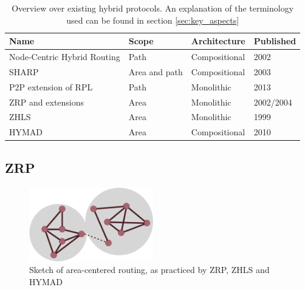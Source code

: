 \documentclass[a4paper,10pt]{scrartcl}
\begin{document}
\begin{table}[t]
    \begin{tabular}{p{}|l|l|l}
        Name & Scope & Architecture & Published \\
        \hline
        Node-Centric Hybrid Routing \cite{Roy_nodecentric} & Path & Compositional & 2002 \\ %
        SHARP\cite{SHARP} & Area and path & Compositional & 2003 \\ %
        P2P extension\cite{RFC-6997} of RPL\cite{RFC-6550} & Path & Monolithic & 2013\\
        ZRP \cite{ZRP-Draft} and extensions \cite{TZRP} \cite{IZR} \cite{WARP} & Area & Monolithic & 2002/2004\\
        ZHLS\cite{ZHLS} & Area & Monolithic & 1999\\
        HYMAD\cite{HYMAD} & Area & Compositional & 2010\\ %
    \end{tabular}
    \caption{Overview over existing hybrid protocols. An explanation of the terminology used can be found in section \ref{sec:key_aspects}}
    \label{fig:overview}
\end{table}


\subsection{\gls{ZRP}}
\label{subsec:zrp}

\begin{figure}
  \begin{center}
    \includegraphics[width=0.48\textwidth]{../images/ZRP}
  \end{center}
  \caption{Sketch of area-centered routing, as practiced by ZRP, ZHLS and HYMAD}
  \label{fig:zrp_area_centered}
\end{figure}
\end{document}
